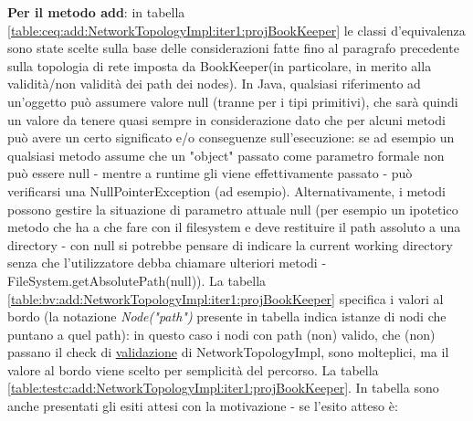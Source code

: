 \documentclass[10pt, a4paper]{article}
\newcommand{\gettablelabel}[5]{table:#1:#2:#3:iter#4:proj#5}
\def\bookkeeper{BookKeeper}
\begin{document}
	\textbf{Per il metodo add}: in tabella 
	\ref{\gettablelabel{ceq}{add}{NetworkTopologyImpl}{1}{\bookkeeper}}
	le classi d'equivalenza sono state scelte sulla base delle considerazioni fatte fino al paragrafo
	precedente sulla topologia di rete imposta da \bookkeeper\;(in particolare, in merito alla validità/non
	validità dei path dei nodes). In Java, qualsiasi riferimento ad
	un'oggetto può assumere valore null (tranne per i tipi primitivi), 
	che sarà quindi un valore da tenere quasi sempre in 
	considerazione dato che per alcuni metodi può avere un certo significato e/o conseguenze 
	sull'esecuzione: se ad esempio un qualsiasi metodo assume che un "object" passato come parametro 
	formale non può essere null - mentre a runtime gli viene effettivamente passato - può verificarsi 
	una NullPointerException (ad esempio). Alternativamente, i metodi possono gestire la situazione
	di parametro attuale null (per esempio un ipotetico metodo che ha a che fare con il filesystem
	e deve restituire il path assoluto a una directory - con null si potrebbe pensare di indicare la 		
	current working directory senza che l'utilizzatore debba chiamare ulteriori metodi - 
	FileSystem.getAbsolutePath(null)). La tabella \ref{\gettablelabel{bv}{add}{NetworkTopologyImpl}{1}
	{\bookkeeper}} specifica i valori al bordo (la notazione \textit{Node("path")} presente in tabella indica
	istanze di nodi che puntano a quel path): in questo caso i nodi con path (non) valido, che (non) 
	passano il check di \underline{validazione} di NetworkTopologyImpl, sono molteplici, ma il valore al 
	bordo viene scelto per semplicità del percorso. 
	La tabella \ref{\gettablelabel{testc}{add}{NetworkTopologyImpl}{1}{\bookkeeper}}. 
	In tabella sono anche presentati
	gli esiti attesi con la motivazione - se l'esito atteso è:
\end{document}
